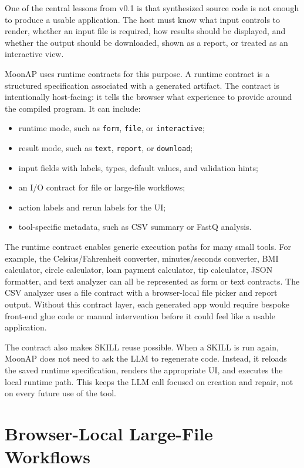 \documentclass[11pt]{article}
\newcommand{\moonap}{MoonAP}
\newcommand{\skill}{SKILL}
\begin{document}
One of the central lessons from v0.1 is that synthesized source code is not enough to produce a usable application. The host must know what input controls to render, whether an input file is required, how results should be displayed, and whether the output should be downloaded, shown as a report, or treated as an interactive view.

\moonap{} uses runtime contracts for this purpose. A runtime contract is a structured specification associated with a generated artifact. The contract is intentionally host-facing: it tells the browser what experience to provide around the compiled program. It can include:

\begin{itemize}[leftmargin=*]
  \item runtime mode, such as \texttt{form}, \texttt{file}, or \texttt{interactive};
  \item result mode, such as \texttt{text}, \texttt{report}, or \texttt{download};
  \item input fields with labels, types, default values, and validation hints;
  \item an I/O contract for file or large-file workflows;
  \item action labels and rerun labels for the UI;
  \item tool-specific metadata, such as CSV summary or FastQ analysis.
\end{itemize}

The runtime contract enables generic execution paths for many small tools. For example, the Celsius/Fahrenheit converter, minutes/seconds converter, BMI calculator, circle calculator, loan payment calculator, tip calculator, JSON formatter, and text analyzer can all be represented as form or text contracts. The CSV analyzer uses a file contract with a browser-local file picker and report output. Without this contract layer, each generated app would require bespoke front-end glue code or manual intervention before it could feel like a usable application.

The contract also makes \skill{} reuse possible. When a \skill{} is run again, \moonap{} does not need to ask the LLM to regenerate code. Instead, it reloads the saved runtime specification, renders the appropriate UI, and executes the local runtime path. This keeps the LLM call focused on creation and repair, not on every future use of the tool.

\section{Browser-Local Large-File Workflows}
\end{document}
